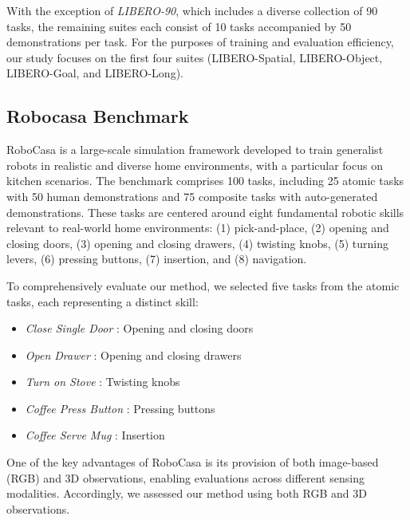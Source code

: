 

With the exception of \textit{LIBERO-90}, which includes a diverse collection of 90 tasks, the remaining suites each consist of 10 tasks accompanied by 50 demonstrations per task. For the purposes of training and evaluation efficiency, our study focuses on the first four suites (LIBERO-Spatial, LIBERO-Object, LIBERO-Goal, and LIBERO-Long).

\subsection{Robocasa Benchmark}

RoboCasa is a large-scale simulation framework developed to train generalist robots in realistic and diverse home environments, with a particular focus on kitchen scenarios. The benchmark comprises 100 tasks, including 25 atomic tasks with 50 human demonstrations and 75 composite tasks with auto-generated demonstrations. These tasks are centered around eight fundamental robotic skills relevant to real-world home environments: (1) pick-and-place, (2) opening and closing doors, (3) opening and closing drawers, (4) twisting knobs, (5) turning levers, (6) pressing buttons, (7) insertion, and (8) navigation.


To comprehensively evaluate our method, we selected five tasks from the atomic tasks, each representing a distinct skill:

\begin{itemize}
    \item \textit{Close Single Door} :  Opening and closing doors
    \item \textit{Open Drawer} :  Opening and closing drawers
    \item \textit{Turn on Stove} :  Twisting knobs
    \item \textit{Coffee Press Button} :  Pressing buttons
    \item \textit{Coffee Serve Mug} :  Insertion
\end{itemize}

One of the key advantages of RoboCasa is its provision of both image-based (RGB) and 3D observations, enabling evaluations across different sensing modalities. Accordingly, we assessed our method using both RGB and 3D observations.


